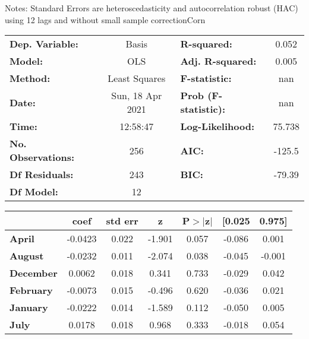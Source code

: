 Notes: \newline
 [1] Standard Errors are heteroscedasticity and autocorrelation robust (HAC) using 12 lags and without small sample correctionCorn\begin{center}
\begin{tabular}{lclc}
\toprule
\textbf{Dep. Variable:}    &      Basis       & \textbf{  R-squared:         } &     0.052   \\
\textbf{Model:}            &       OLS        & \textbf{  Adj. R-squared:    } &     0.005   \\
\textbf{Method:}           &  Least Squares   & \textbf{  F-statistic:       } &       nan   \\
\textbf{Date:}             & Sun, 18 Apr 2021 & \textbf{  Prob (F-statistic):} &      nan    \\
\textbf{Time:}             &     12:58:47     & \textbf{  Log-Likelihood:    } &    75.738   \\
\textbf{No. Observations:} &         256      & \textbf{  AIC:               } &    -125.5   \\
\textbf{Df Residuals:}     &         243      & \textbf{  BIC:               } &    -79.39   \\
\textbf{Df Model:}         &          12      & \textbf{                     } &             \\
\bottomrule
\end{tabular}
\begin{tabular}{lcccccc}
                   & \textbf{coef} & \textbf{std err} & \textbf{z} & \textbf{P$> |$z$|$} & \textbf{[0.025} & \textbf{0.975]}  \\
\midrule
\textbf{April}     &      -0.0423  &        0.022     &    -1.901  &         0.057        &       -0.086    &        0.001     \\
\textbf{August}    &      -0.0232  &        0.011     &    -2.074  &         0.038        &       -0.045    &       -0.001     \\
\textbf{December}  &       0.0062  &        0.018     &     0.341  &         0.733        &       -0.029    &        0.042     \\
\textbf{February}  &      -0.0073  &        0.015     &    -0.496  &         0.620        &       -0.036    &        0.021     \\
\textbf{January}   &      -0.0222  &        0.014     &    -1.589  &         0.112        &       -0.050    &        0.005     \\
\textbf{July}      &       0.0178  &        0.018     &     0.968  &         0.333        &       -0.018    &        0.054     \\

\end{tabular}
\end{center}
